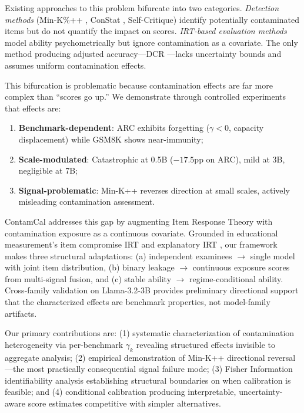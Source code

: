 \documentclass[11pt]{article}
\begin{document}
Existing approaches to this problem bifurcate into two categories. \emph{Detection methods} (Min-K\%++ \citep{shi2024detecting}, ConStat \citep{dekoninck2024constat}, Self-Critique) identify potentially contaminated items but do not quantify the impact on scores. \emph{IRT-based evaluation methods} \citep{lalor2024irt,polo2024tinybenchmarks} model ability psychometrically but ignore contamination as a covariate. The only method producing adjusted accuracy---DCR \citep{oren2024proving}---lacks uncertainty bounds and assumes uniform contamination effects.

This bifurcation is problematic because contamination effects are far more complex than ``scores go up.'' We demonstrate through controlled experiments that effects are:
\begin{enumerate}
    \item \textbf{Benchmark-dependent}: ARC exhibits forgetting ($\gamma < 0$, capacity displacement) while GSM8K shows near-immunity;
    \item \textbf{Scale-modulated}: Catastrophic at 0.5B ($-17.5$pp on ARC), mild at 3B, negligible at 7B;
    \item \textbf{Signal-problematic}: Min-K++ reverses direction at small scales, actively misleading contamination assessment.
\end{enumerate}

ContamCal addresses this gap by augmenting Item Response Theory with contamination exposure as a continuous covariate. Grounded in educational measurement's item compromise IRT \citep{eckerly2017detecting,sinharay2017detection} and explanatory IRT \citep{deboeck2004explanatory}, our framework makes three structural adaptations: (a) independent examinees $\to$ single model with joint item distribution, (b) binary leakage $\to$ continuous exposure scores from multi-signal fusion, and (c) stable ability $\to$ regime-conditional ability. Cross-family validation on Llama-3.2-3B provides preliminary directional support that the characterized effects are benchmark properties, not model-family artifacts.

Our primary contributions are: (1) systematic characterization of contamination heterogeneity via per-benchmark $\gamma_k$ revealing structured effects invisible to aggregate analysis; (2) empirical demonstration of Min-K++ directional reversal---the most practically consequential signal failure mode; (3) Fisher Information identifiability analysis establishing structural boundaries on when calibration is feasible; and (4) conditional calibration producing interpretable, uncertainty-aware score estimates competitive with simpler alternatives.
\end{document}
